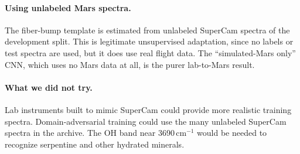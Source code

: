 \paragraph{Using unlabeled Mars spectra.} The fiber-bump template is estimated from unlabeled SuperCam spectra of the development split. This is legitimate unsupervised adaptation, since no labels or test spectra are used, but it does use real flight data. The ``simulated-Mars only'' CNN, which uses no Mars data at all, is the purer lab-to-Mars result.

\paragraph{What we did not try.} Lab instruments built to mimic SuperCam \citep{manrique2024simulcam} could provide more realistic training spectra. Domain-adversarial training \citep{ganin2016domain} could use the many unlabeled SuperCam spectra in the archive. The OH band near 3690\,cm$^{-1}$ would be needed to recognize serpentine and other hydrated minerals.
